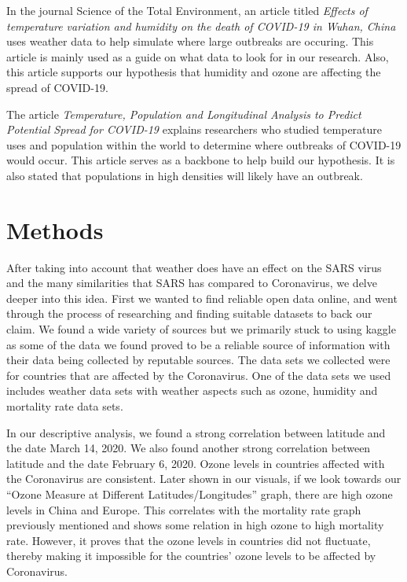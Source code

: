 \documentclass[10pt,journal,compsoc]{IEEEtran}
\begin{document}
	In the journal Science of the Total Environment, an article titled \textit{Effects of temperature variation and humidity on the death of COVID-19 in Wuhan, China} uses weather data to help simulate where large outbreaks are occuring. \cite{Ma-2020} This article is mainly used as a guide on what data to look for in our research. Also, this article supports our hypothesis that humidity and ozone are affecting the spread of COVID-19.

	The article \textit{Temperature, Population and Longitudinal Analysis to Predict Potential Spread for COVID-19} explains researchers who studied temperature uses and population within the world to determine where outbreaks of COVID-19 would occur. \cite{Dangi-2020} This article serves as a backbone to help build our hypothesis. It is also stated that populations in high densities will likely have an outbreak. \cite{Dangi-2020}

\section{Methods}\label{sec:methods}

	After taking into account that weather does have an effect on the SARS virus and the many similarities that SARS has compared to Coronavirus, we delve deeper into this idea. First we wanted to find reliable open data online, and went through the process of researching and finding suitable datasets to back our claim. We found a wide variety of sources but we primarily stuck to using kaggle as some of the data we found proved to be a reliable source of information with their data being collected by reputable sources. The data sets we collected were for countries that are affected by the Coronavirus. One of the data sets we used includes weather data sets with weather aspects such as ozone, humidity and mortality rate data sets.

	In our descriptive analysis, we found a strong correlation between latitude and the date March 14, 2020. We also found another strong correlation between latitude and the date February 6, 2020. Ozone levels in countries affected with the Coronavirus are consistent. Later shown in our visuals, if we look towards our “Ozone Measure at Different Latitudes/Longitudes” graph, there are high ozone levels in China and Europe. This correlates with the mortality rate graph previously mentioned and shows some relation in high ozone to high mortality rate. However, it proves that the ozone levels in countries did not fluctuate, thereby making it impossible for the countries’ ozone levels to be affected by Coronavirus.
\end{document}
